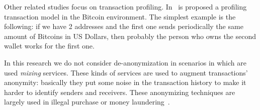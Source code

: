 Other related studies focus on transaction profiling.
In~\cite{bib:fullDiscl} is
proposed a profiling transaction model in the Bitcoin environment. The
simplest example is the following: if we have 2 addresses and the first one
sends periodically the same amount of Bitcoins in US Dollars, then probably
the person who owns the second wallet works for the first one.

In this research we do not consider de-anonymization in scenarios in which are
used \textit{mixing} services. These kinds of services are used to augment
transactions' anonymity: basically they put some noise in the transaction
history to make it harder to identify senders and receivers.
These anonymizing techniques are largely used in illegal purchase or money
laundering~\cite{bib:laundering}.
